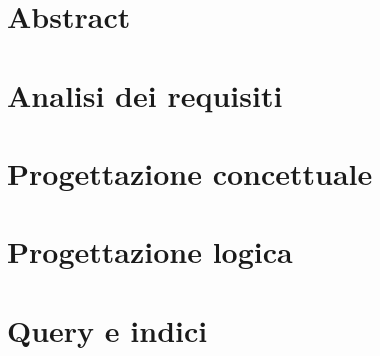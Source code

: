 \documentclass[a4paper,10pt]{article}
\begin{document}
    \tableofcontents

	\section{Abstract}
    
    
    \section{Analisi dei requisiti}
        

    \section{Progettazione concettuale}
        

    \section{Progettazione logica}
        

    \section{Query e indici}
        
\end{document}

